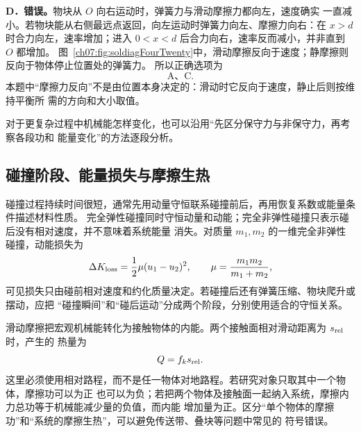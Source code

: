 {\begin{xesolution}
\textbf{D．错误。}\quad 物块从 $O$ 向右运动时，弹簧力与滑动摩擦力都向左，速度确实
一直减小。若物块能从右侧最远点返回，向左运动时弹簧力向左、摩擦力向右：在 $x>d$
时合力向左，速率增加；进入 $0<x<d$ 后合力向右，速率反而减小，并非直到 $O$ 都增加。
图~\ref{ch07:fig:soldiagFourTwenty}中，滑动摩擦反向于速度；静摩擦则反向于物体停止位置处的弹簧力。
\soldiagFourTwenty
所以正确选项为
\[
 \boxed{\text{A、C}}.
\]
本题中“摩擦力反向”不是由位置本身决定的：滑动时它反向于速度，静止后则按维持平衡所
需的方向和大小取值。
\end{xesolution}

对于更复杂过程中机械能怎样变化，也可以沿用“先区分保守力与非保守力，再考察各段功和
能量变化”的方法逐段分析。

\subsection{碰撞阶段、能量损失与摩擦生热}

碰撞过程持续时间很短，通常先用动量守恒联系碰撞前后，再用恢复系数或能量条件描述材料性质。
完全弹性碰撞同时守恒动量和动能；完全非弹性碰撞只表示碰后没有相对速度，并不意味着系统能量
消失。对质量 $m_1,m_2$ 的一维完全非弹性碰撞，动能损失为
\begin{equation*}
 \Delta K_{\rm loss}=\frac12\mu(u_1-u_2)^2,
 \qquad \mu=\frac{m_1m_2}{m_1+m_2},
\end{equation*}
可见损失只由碰前相对速度和约化质量决定。若碰撞后还有弹簧压缩、物块爬升或摆动，应把
“碰撞瞬间”和“碰后运动”分成两个阶段，分别使用适合的守恒关系。

滑动摩擦把宏观机械能转化为接触物体的内能。两个接触面相对滑动距离为 $s_{\rm rel}$ 时，产生的
热量为
\begin{equation*}
 Q=f_k s_{\rm rel}.
\end{equation*}
这里必须使用相对路程，而不是任一物体对地路程。若研究对象只取其中一个物体，摩擦功可以为正
也可以为负；若把两个物体及接触面一起纳入系统，摩擦内力总功等于机械能减少量的负值，而内能
增加量为正。区分“单个物体的摩擦功”和“系统的摩擦生热”，可以避免传送带、叠块等问题中常见的
符号错误。
}

\endgroup
